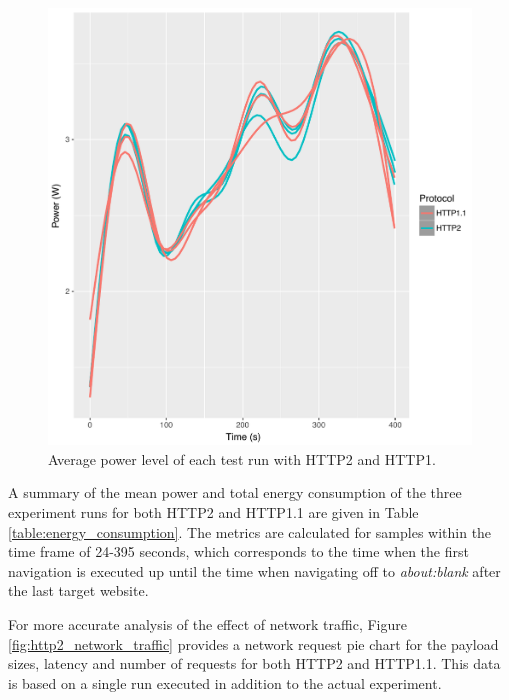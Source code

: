 \documentclass{article}
\begin{document}
\begin{figure}[h!]
\centering
\includegraphics[scale=0.7]{images/smoothed_power}
\caption{Average power level of each test run with HTTP2 and HTTP1.}
\label{fig:smoothed_power}
\end{figure}

A summary of the mean power and total energy consumption of the three experiment runs for both HTTP2 and HTTP1.1 are given in Table \ref{table:energy_consumption}. The metrics are calculated for samples within the time frame of 24-395 seconds, which corresponds to the time when the first navigation is executed up until the time when navigating off to \emph{about:blank} after the last target website.

For more accurate analysis of the effect of network traffic, Figure \ref{fig:http2_network_traffic} provides a network request pie chart for the payload sizes, latency and number of requests for both HTTP2 and HTTP1.1. This data is based on a single run executed in addition to the actual experiment.
\end{document}
